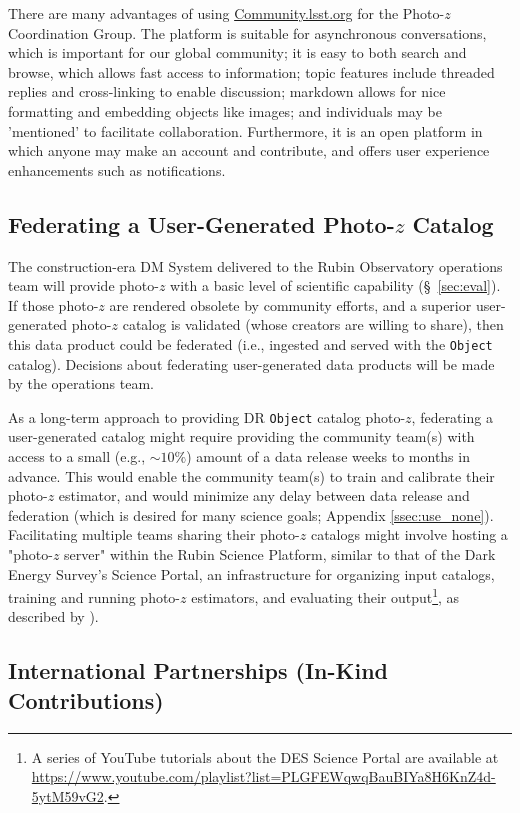 \documentclass[DM,authoryear,toc]{lsstdoc}
\begin{document}
There are many advantages of using \url{Community.lsst.org} for the Photo-$z$ Coordination Group.
The platform is suitable for asynchronous conversations, which is important for our global community; it is easy to both search and browse, which allows fast access to information; topic features include threaded replies and cross-linking to enable discussion; markdown allows for nice formatting and embedding objects like images; and individuals may be 'mentioned' to facilitate collaboration.
Furthermore, it is an open platform in which anyone may make an account and contribute, and offers user experience enhancements such as notifications.

\subsection{Federating a User-Generated Photo-$z$ Catalog}\label{ssec:time_ops_ugfed}

The construction-era DM System delivered to the Rubin Observatory operations team will provide photo-$z$ with a basic level of scientific capability (\S~\ref{sec:eval}). 
If those photo-$z$ are rendered obsolete by community efforts, and a superior user-generated photo-$z$ catalog is validated (whose creators are willing to share), then this data product could be federated (i.e., ingested and served with the {\tt Object} catalog).
Decisions about federating user-generated data products will be made by the operations team.

As a long-term approach to providing DR {\tt Object} catalog photo-$z$, federating a user-generated catalog might require providing the community team(s) with access to a small (e.g., $\sim10\%$) amount of a data release weeks to months in advance.
This would enable the community team(s) to train and calibrate their photo-$z$ estimator, and would minimize any delay between data release and federation (which is desired for many science goals; Appendix \ref{ssec:use_none}).
Facilitating multiple teams sharing their photo-$z$ catalogs might involve hosting a "photo-$z$ server" within the Rubin Science Platform, similar to that of the Dark Energy Survey's Science Portal, an infrastructure for organizing input catalogs, training and running photo-$z$ estimators, and evaluating their output\footnote{A series of YouTube tutorials about the DES Science Portal are available at \url{https://www.youtube.com/playlist?list=PLGFEWqwqBauBIYa8H6KnZ4d-5ytM59vG2}.}, as described by \citet{2018A&C....25...58G}).

\subsection{International Partnerships (In-Kind Contributions)}\label{ssec:time_inkind}
\end{document}
